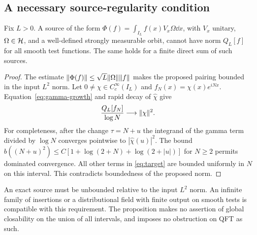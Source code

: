 \subsection{A necessary source-regularity condition}
\begin{proposition}\label{prop:bounded-source}
Fix $L>0$. A source of the form
$\Phi(f)=\int_{I_L}f(x)V_x\Omega\dd x$, with $V_x$ unitary,
$\Omega\in\mathcal H$, and a well-defined strongly measurable orbit, cannot
have norm $Q_L[f]$ for all smooth test functions. The same holds for
a finite direct sum of such sources.
\end{proposition}
\begin{proof}
The estimate $\lVert \Phi(f)\rVert\leq\sqrt L\lVert \Omega\rVert\lVert f\rVert$ makes
the proposed pairing bounded in the input $L^2$ norm. Let
$0\ne\chi\in C_c^\infty(I_L)$ and $f_N(x)=\chi(x)e^{iNx}$.
Equation~\eqref{eq:gamma-growth} and rapid decay of $\widehat\chi$
give
\begin{equation}\label{eq:high-frequency}
 \frac{Q_L[f_N]}{\log N}\longrightarrow\lVert \chi\rVert^2.
\end{equation}
For completeness, after the change $\tau=N+u$ the integrand of the
gamma term divided by $\log N$ converges pointwise to
$|\widehat\chi(u)|^2$. The bound
$b((N+u)^2)\leq C[1+\log(2+N)+\log(2+|u|)]$ for $N\geq2$
permits dominated convergence. All other terms in
\eqref{eq:target} are bounded uniformly in $N$ on this interval.
This contradicts boundedness of the proposed norm.
\end{proof}
An exact source must be unbounded relative to the input $L^2$ norm.
An infinite family of insertions or a distributional field with finite
output on smooth tests is compatible with this requirement. The
proposition makes no assertion of global closability on the union of
all intervals, and imposes no obstruction on QFT as such.
